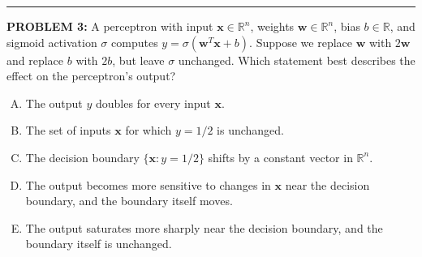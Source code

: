 \documentclass[12pt]{amsart}
\newcommand{\divider}{
  \vspace{-1em} %
  \noindent
  \raisebox{-0.15ex}{\textbullet}%
  \hspace{0.5em}%
  \rule[0.5ex]{0.95\textwidth}{1.0pt}%
  \hspace{0.5em}%
  \raisebox{-0.15ex}{\textbullet}%
  \vspace{0em} %
}
\begin{document}
\divider

\newpage 

{\bf PROBLEM 3:}
A perceptron with input $\mathbf{x} \in \mathbb{R}^n$, weights $\mathbf{w} \in \mathbb{R}^n$, 
bias $b \in \mathbb{R}$, and sigmoid activation $\sigma$ computes 
$y = \sigma(\mathbf{w}^T\mathbf{x} + b)$. Suppose we replace $\mathbf{w}$ with $2\mathbf{w}$ 
and replace $b$ with $2b$, but leave $\sigma$ unchanged. Which statement best describes 
the effect on the perceptron's output?
\begin{enumerate}[(A)]
\item The output $y$ doubles for every input $\mathbf{x}$.
\item The set of inputs $\mathbf{x}$ for which $y = 1/2$ is unchanged.
\item The decision boundary $\{\mathbf{x} : y = 1/2\}$ shifts by a constant vector in $\mathbb{R}^n$.
\item The output becomes more sensitive to changes in $\mathbf{x}$ near the decision boundary, 
and the boundary itself moves.
\item The output saturates more sharply near the decision boundary, and the boundary itself 
is unchanged.
\end{enumerate}
%
%
%
\end{document}
